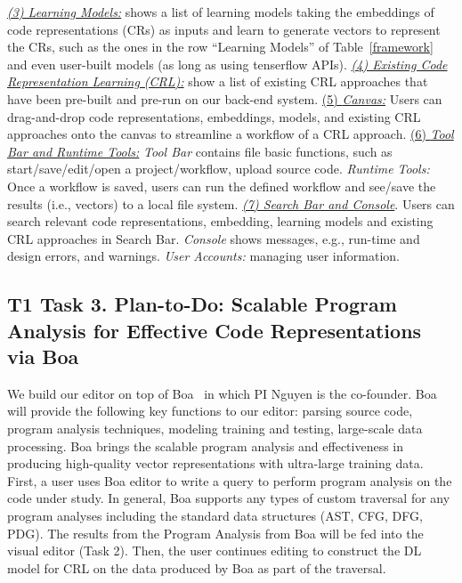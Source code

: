 \underline{\textit{(3) Learning Models:}} shows a list of learning
models taking the embeddings of code representations (CRs) as inputs
and learn to generate vectors to represent the CRs, such as the ones
in the row ``Learning Models'' of Table~\ref{framework} and even
user-built models (as long as using tenserflow APIs).
\underline{\textit{(4) Existing Code Representation Learning (CRL):}}
show a list of existing CRL approaches that have been pre-built and
pre-run on our back-end system.  \underline{(5) \textit{Canvas:}}
Users can drag-and-drop code representations, embeddings, models, and
existing CRL approaches onto the canvas to streamline a workflow of a
CRL approach.  \underline{(6) \textit{Tool Bar and Runtime Tools:}}
\textit{Tool Bar} contains file basic functions, such as
start/save/edit/open a project/workflow, upload source
code. \textit{Runtime Tools:} Once a workflow is saved, users can run
the defined workflow and see/save the results (i.e., vectors) to a
local file system.  \underline{\textit{(7) Search Bar and
    Console}}. Users can search relevant code representations,
embedding, learning models and existing CRL approaches in Search
Bar. \textit{Console} shows messages, e.g., run-time and design
errors, and warnings.  \textit{User Accounts:} managing user
information.


\subsection{T1 Task 3. Plan-to-Do: Scalable Program Analysis for Effective Code Representations via Boa}

We build our editor on top of
Boa~\cite{boa,Dyer-Nguyen-Rajan-Nguyen-13}
in which PI Nguyen is the co-founder.
Boa will provide the following key functions to our editor: parsing
source code, program analysis techniques, modeling training and
testing, large-scale data processing. Boa brings the scalable program
analysis and effectiveness in producing high-quality vector
representations with ultra-large training data.
%
First, a user uses Boa editor to write a query to perform program
analysis on the code under study.
%
In general, Boa supports any types of custom traversal for any program
analyses including the standard data structures (AST, CFG, DFG,
PDG). The results from the Program Analysis from Boa will be fed into
the visual editor (Task 2).  Then, the user continues editing to
construct the DL model for CRL on the data produced by Boa as part of
the traversal.

